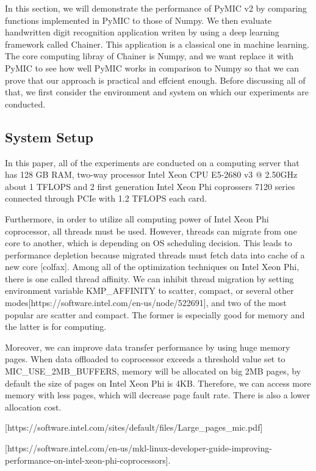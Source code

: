 In this section, we will demonstrate the performance of PyMIC v2 by comparing functions implemented in PyMIC to those of Numpy. We then evaluate handwritten digit recognition application writen by using a deep learning framework called Chainer. This application is a classical one in machine learning. The core computing libray of Chainer is Numpy, and we want replace it with PyMIC to see how well PyMIC works in comparison to Numpy so that we can prove that our approach is practical and effcient enough. Before discussing all of that, we first consider the environment and system on which our experiments are conducted.

\subsection{System Setup}
In this paper, all of the experiments are conducted on a computing server that has 128 GB RAM, two-way processor Intel Xeon CPU E5-2680 v3 @ 2.50GHz about 1 TFLOPS and 2 first generation Intel Xeon Phi coprossers 7120 series connected through PCIe with 1.2 TFLOPS each card.

Furthermore, in order to utilize all computing power of Intel Xeon Phi coprocessor, all threads must be used. However, threads can migrate from one core to another, which is depending on OS scheduling decision. This leads to performance depletion because migrated threads must fetch data into cache of a new core [colfax]. Among all of the optimization techniques on Intel Xeon Phi, there is one called thread affinity. We can inhibit thread migration by setting environment variable KMP\_AFFINITY to scatter, compact, or several other modes[https://software.intel.com/en-us/node/522691], and two of the most popular are scatter and compact. The former is especially good for memory and the latter is for computing.

Moreover, we can improve data transfer performance by using huge memory pages. When data offloaded to coprocessor exceeds a threshold value set to MIC\_USE\_2MB\_BUFFERS, memory will be allocated on big 2MB pages, by default the size of pages on Intel Xeon Phi is 4KB. Therefore, we can access more memory with less pages, which will decrease page fault rate. There is also a lower allocation cost.

[https://software.intel.com/sites/default/files/Large\_pages\_mic.pdf]


[https://software.intel.com/en-us/mkl-linux-developer-guide-improving-performance-on-intel-xeon-phi-coprocessors].

